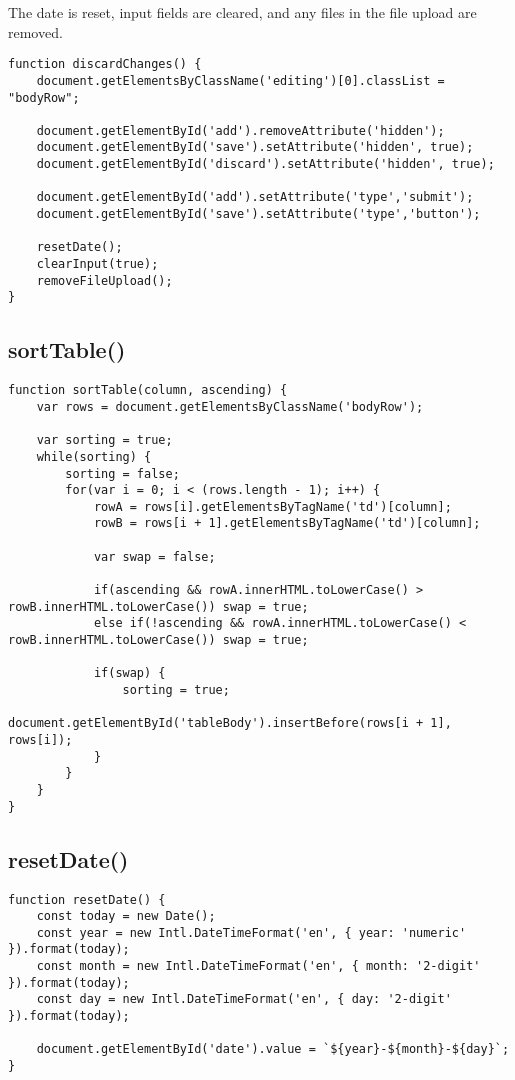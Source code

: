 \documentclass[letterpaper]{article}
\begin{document}
The date is reset, input fields are cleared, and any files in the file upload are removed.

\begin{lstlisting}[firstnumber=337]
function discardChanges() {
    document.getElementsByClassName('editing')[0].classList = "bodyRow";

    document.getElementById('add').removeAttribute('hidden');
    document.getElementById('save').setAttribute('hidden', true);
    document.getElementById('discard').setAttribute('hidden', true);

    document.getElementById('add').setAttribute('type','submit');
    document.getElementById('save').setAttribute('type','button');

    resetDate();
    clearInput(true);
    removeFileUpload();
}
\end{lstlisting}

\subsection{sortTable()}

\begin{lstlisting}[firstnumber=352]
function sortTable(column, ascending) {
    var rows = document.getElementsByClassName('bodyRow');

    var sorting = true;
    while(sorting) {
        sorting = false;
        for(var i = 0; i < (rows.length - 1); i++) {
            rowA = rows[i].getElementsByTagName('td')[column];
            rowB = rows[i + 1].getElementsByTagName('td')[column];

            var swap = false;

            if(ascending && rowA.innerHTML.toLowerCase() > rowB.innerHTML.toLowerCase()) swap = true;
            else if(!ascending && rowA.innerHTML.toLowerCase() < rowB.innerHTML.toLowerCase()) swap = true;

            if(swap) {
                sorting = true;
                document.getElementById('tableBody').insertBefore(rows[i + 1], rows[i]);
            }
        }
    }
}
\end{lstlisting}

\subsection{resetDate()}

\begin{lstlisting}[firstnumber=375]
function resetDate() {
    const today = new Date();
    const year = new Intl.DateTimeFormat('en', { year: 'numeric' }).format(today);
    const month = new Intl.DateTimeFormat('en', { month: '2-digit' }).format(today);
    const day = new Intl.DateTimeFormat('en', { day: '2-digit' }).format(today);

    document.getElementById('date').value = `${year}-${month}-${day}`;
}
\end{lstlisting}
\end{document}
